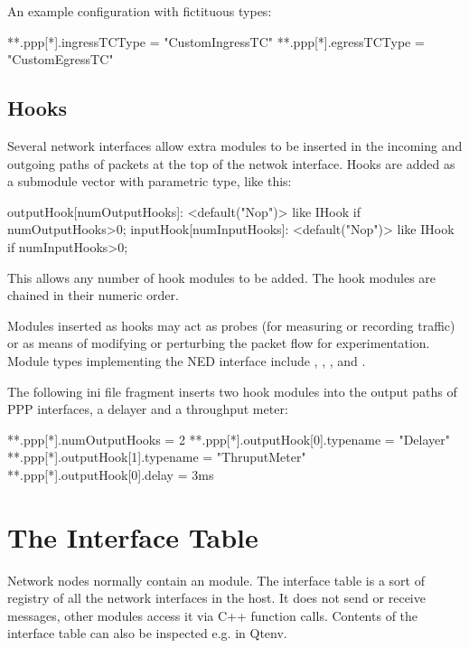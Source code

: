 An example configuration with fictituous types:

\begin{inifile}
**.ppp[*].ingressTCType = "CustomIngressTC"
**.ppp[*].egressTCType = "CustomEgressTC"
\end{inifile}


\subsection{Hooks}
\label{sec:interfaces:hooks}

Several network interfaces allow extra modules to be inserted in the incoming
and outgoing paths of packets at the top of the netwok interface.
Hooks are added as a submodule vector with parametric type, like this:

\begin{ned}
outputHook[numOutputHooks]: <default("Nop")> like IHook if numOutputHooks>0;
inputHook[numInputHooks]: <default("Nop")> like IHook if numInputHooks>0;
\end{ned}

This allows any number of hook modules to be added. The hook modules
are chained in their numeric order.

Modules inserted as hooks may act as probes (for measuring or recording
traffic) or as means of modifying or perturbing the packet flow for
experimentation. Module types implementing the  NED interface
include , , ,
and .

The following ini file fragment inserts two hook modules into the output
paths of PPP interfaces, a delayer and a throughput meter:

\begin{inifile}
**.ppp[*].numOutputHooks = 2
**.ppp[*].outputHook[0].typename = "Delayer"
**.ppp[*].outputHook[1].typename = "ThruputMeter"
**.ppp[*].outputHook[0].delay = 3ms
\end{inifile}



\section{The Interface Table}
\label{sec:interfaces:the-interface-table}

Network nodes normally contain an  module.
The interface table is a sort of registry of all the network interfaces
in the host. It does not send or receive messages, other modules access it
via C++ function calls. Contents of the interface table can also
be inspected e.g. in Qtenv.

